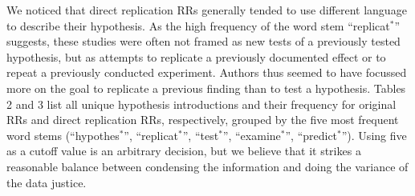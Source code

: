 \documentclass[british,,man,floatsintext]{apa6}
\begin{document}
We noticed that direct replication RRs generally tended to use different language to describe their hypothesis. As the high frequency of the word stem \enquote{replicat\(^\ast\)} suggests, these studies were often not framed as new tests of a previously tested hypothesis, but as attempts to replicate a previously documented effect or to repeat a previously conducted experiment.
Authors thus seemed to have focussed more on the goal to replicate a previous finding than to test a hypothesis.
Tables 2 and 3 list all unique hypothesis introductions and their frequency for original RRs and direct replication RRs, respectively, grouped by the five most frequent word stems (\enquote{hypothes\(^\ast\)}, \enquote{replicat\(^\ast\)}, \enquote{test\(^\ast\)}, \enquote{examine\(^\ast\)}, \enquote{predict\(^\ast\)}).
Using five as a cutoff value is an arbitrary decision, but we believe that it strikes a reasonable balance between condensing the information and doing the variance of the data justice.
\end{document}
